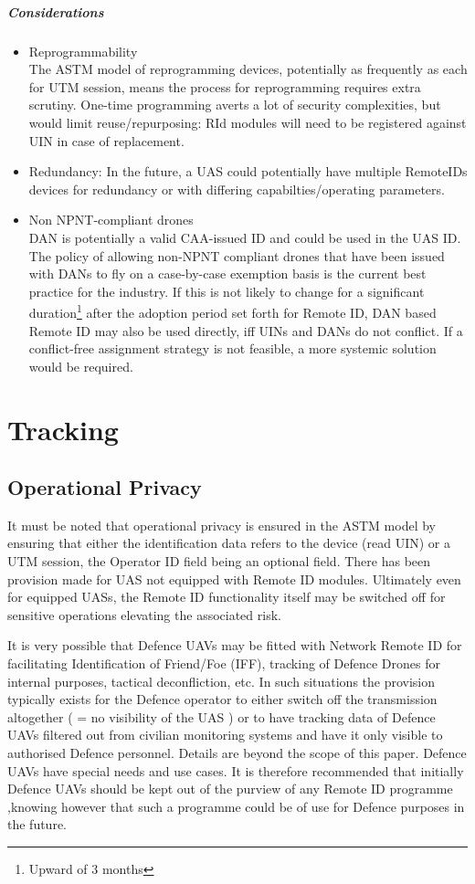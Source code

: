 \documentclass{ua_wgs_base}
\begin{document}
\subparagraph{Considerations}
\begin{itemize}
\item Reprogrammability\\
The ASTM model of reprogramming devices, potentially as frequently
as each for UTM session, means the process for reprogramming requires
extra scrutiny. One-time programming averts a lot of security complexities,
but would limit reuse/repurposing: RId modules will need to be registered
against UIN in case of replacement.
\item Redundancy: In the future, a UAS could potentially have multiple RemoteIDs
devices for redundancy or with differing capabilties/operating parameters. 
\item Non NPNT-compliant drones\\
DAN is potentially a valid CAA-issued ID and could be used in the
UAS ID. The policy of allowing non-NPNT compliant drones that have
been issued with DANs to fly on a case-by-case exemption basis is
the current best practice for the industry. If this is not likely
to change for a significant duration\footnote{Upward of 3 months}
after the adoption period set forth for Remote ID, DAN based Remote
ID may also be used directly, iff UINs and DANs do not conflict. If
a conflict-free assignment strategy is not feasible, a more systemic
solution would be required.
\end{itemize}

\section{Tracking}

\subsection{Operational Privacy}

It must be noted that operational privacy is ensured in the ASTM model
by ensuring that either the identification data refers to the device
(read UIN) or a UTM session, the Operator ID field being an optional
field. There has been provision made for UAS not equipped with Remote
ID modules. Ultimately even for equipped UASs, the Remote ID functionality
itself may be switched off for sensitive operations elevating the
associated risk.

It is very possible that Defence UAVs may be fitted with Network Remote
ID for facilitating Identification of Friend/Foe (IFF),
tracking of Defence Drones for internal purposes, tactical deconfliction,
etc. In such situations the provision typically exists for the Defence
operator to either switch off the transmission altogether ( = no visibility
of the UAS ) or to have tracking data of Defence UAVs filtered out
from civilian monitoring systems and have it only visible to authorised
Defence personnel. Details are beyond the scope of this paper. Defence
UAVs have special needs and use cases. It is therefore recommended
that initially Defence UAVs should be kept out of the purview of any
Remote ID programme ,knowing however that such a programme could be
of use for Defence purposes in the future.
\end{document}
